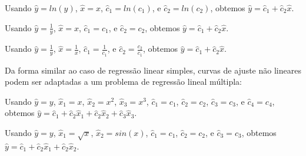 \begin{example}[Curva de ajuste 
$y=c_1 {c_2}^x$:]
Usando 
$\hat{y}=ln(y)$,  
$\hat{x}=x$, 
$\hat{c}_1=ln(c_1)$, e
$\hat{c}_2=ln(c_2)$, obtemos $\hat{y}=\hat{c}_1+\hat{c}_2 \hat{x}$.
\end{example}

\begin{example}[Curva de ajuste 
$y=\left(c_1 + {c_2} x \right)^{-1}$:]
Usando 
$\hat{y}=\frac{1}{y}$,  
$\hat{x}=x$, 
$\hat{c}_1=c_1$, e 
$\hat{c}_2=c_2$, obtemos $\hat{y}=\hat{c}_1+\hat{c}_2 \hat{x}$.
\end{example}

\begin{example}[Curva de ajuste 
$y=c_1 x \left(c_2 + x\right)^{-1}$:]
Usando 
$\hat{y}=\frac{1}{y}$,  
$\hat{x}=\frac{1}{x}$, 
$\hat{c}_1=\frac{1}{c_1}$, e 
$\hat{c}_2=\frac{c_2}{c_1}$, obtemos $\hat{y}=\hat{c}_1+\hat{c}_2 \hat{x}$.
\end{example}

Da forma similar ao caso de regressão linear simples,
curvas de ajuste não lineares podem ser adaptadas a um problema de regressão lineal múltipla:
\begin{example}[Curva de ajuste 
$y=c_1 +c_2 x + c_3 x^2 + c_4 x^3 $:]
Usando 
$\hat{y}=y$,  
$\hat{x}_1=x$,
$\hat{x}_2=x^2$,
$\hat{x}_3=x^3$, 
$\hat{c}_1=c_1$, 
$\hat{c}_2=c_2$, 
$\hat{c}_3=c_3$, e 
$\hat{c}_4=c_4$, obtemos $\hat{y}=\hat{c}_1+\hat{c}_2 \hat{x}_1+\hat{c}_2 \hat{x}_2+\hat{c}_3 \hat{x}_3$.
\end{example}

\begin{example}[Curva de ajuste 
$y=c_1 +c_2 \sqrt{x} + c_3 sin(x) $:]
Usando 
$\hat{y}=y$,  
$\hat{x}_1=\sqrt{x}$,
$\hat{x}_2=sin(x)$, 
$\hat{c}_1=c_1$, 
$\hat{c}_2=c_2$, e 
$\hat{c}_3=c_3$, obtemos $\hat{y}=\hat{c}_1+\hat{c}_2 \hat{x}_1+\hat{c}_2 \hat{x}_2$.
\end{example}
